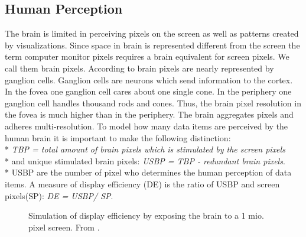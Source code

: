 \subsection{Human Perception} \label{perception}
The brain is limited in perceiving pixels on the screen as well as patterns created by visualizations. Since space in brain is represented different from the screen the term computer monitor pixels requires a brain equivalent for screen pixels. We call them brain pixels. According to \cite{Ware2012a} brain pixels are nearly represented by ganglion cells. Ganglion cells are neurons which send information to the cortex. In the fovea one ganglion cell cares about one single cone. In the periphery one ganglion cell handles thousand rods and cones. Thus, the brain pixel resolution in the fovea is much higher than in the periphery. The brain aggregates pixels and adheres multi-resolution. 
To model how many data items are perceived by the human brain it is important to make the following distinction: 
\\*
\textit{TBP = total amount of brain pixels which is stimulated by the screen pixels}\\*
and unique stimulated brain pixels: \textit{USBP = TBP - redundant brain pixels}.\\*
USBP are the number of pixel who determines the human perception of data items. A measure of display efficiency (DE) is the ratio of USBP and screen pixels(SP): \textit{DE = USBP/ SP}.

\begin{figure}[H]
    \centering
    \caption{Simulation of display efficiency by exposing the brain to a 1 mio. pixel screen. From \cite{Ware2012a}.}
    \label{fig:DE}
\end{figure}


